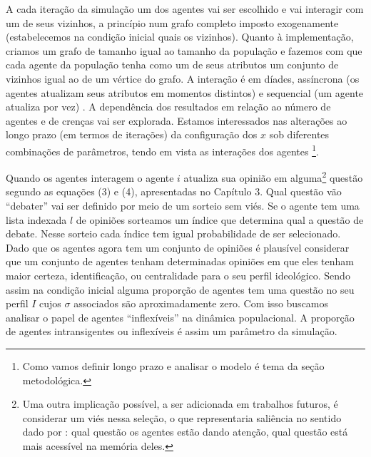 A cada iteração da simulação um dos agentes vai ser escolhido e vai
interagir com um de seus vizinhos, a princípio num grafo completo imposto
exogenamente (estabelecemos na condição inicial quais os vizinhos). Quanto à
implementação, criamos um grafo de tamanho igual ao tamanho da população e
fazemos com que cada agente da população tenha como um de seus atributos um
conjunto de vizinhos igual ao de um vértice do grafo. A interação é em díades,
assíncrona (os agentes atualizam seus atributos em momentos distintos) e
sequencial (um agente atualiza por vez) \cite{wilensky2015introduction}. A
dependência dos resultados em relação ao número de agentes e de crenças vai ser
explorada. Estamos interessados nas alterações ao longo prazo (em termos de
iterações) da configuração dos \(x\) sob diferentes combinações de parâmetros,
tendo em vista as interações dos agentes \cite{acemoglu2011opinion}
\footnote{Como vamos definir longo prazo e analisar o modelo é tema da seção
  metodológica.}.

Quando os agentes interagem o agente \(i\) atualiza sua opinião em
alguma\footnote{ Uma outra implicação possível, a ser adicionada em trabalhos
  futuros, é considerar um viés nessa seleção, o que representaria saliência no
  sentido dado por : qual questão os agentes estão
  dando atenção, qual questão está mais acessível na memória deles.} questão
segundo as equações (3) e (4), apresentadas no Capítulo 3. Qual questão vão
``debater'' vai ser definido por meio de um sorteio sem viés. Se o agente tem
uma lista indexada \(l\) de opiniões sorteamos um índice que determina qual a
questão de debate. Nesse sorteio cada índice tem igual probabilidade de ser
selecionado. Dado que os agentes agora tem um conjunto de opiniões é plausível
considerar que um conjunto de agentes tenham determinadas opiniões em que eles
tenham maior certeza, identificação, ou centralidade para o seu perfil
ideológico. Sendo assim na condição inicial alguma proporção de agentes tem uma
questão no seu perfil \(I\) cujos \(\sigma\) associados são aproximadamente zero. Com
isso buscamos analisar o papel de agentes ``inflexíveis'' na dinâmica
populacional. A proporção de agentes intransigentes ou inflexíveis é assim um
parâmetro da simulação.

